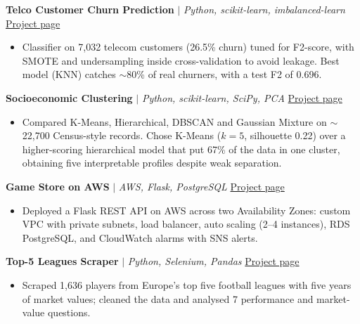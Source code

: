\documentclass[10pt,a4paper]{article}
\begin{document}
\noindent
\textbf{Telco Customer Churn Prediction} $\vert$ \textit{\small Python, scikit-learn, imbalanced-learn} \hfill \href{https://rodrigopintoaguilera.github.io/churn/}{\small Project page}
\begin{itemize}
    \item Classifier on 7,032 telecom customers (26.5\% churn) tuned for F2-score, with SMOTE and undersampling inside cross-validation to avoid leakage. Best model (KNN) catches $\sim$80\% of real churners, with a test F2 of 0.696.
\end{itemize}

\vspace{3pt}

\noindent
\textbf{Socioeconomic Clustering} $\vert$ \textit{\small Python, scikit-learn, SciPy, PCA} \hfill \href{https://rodrigopintoaguilera.github.io/clustering/}{\small Project page}
\begin{itemize}
    \item Compared K-Means, Hierarchical, DBSCAN and Gaussian Mixture on $\sim$22,700 Census-style records. Chose K-Means ($k=5$, silhouette 0.22) over a higher-scoring hierarchical model that put 67\% of the data in one cluster, obtaining five interpretable profiles despite weak separation.
\end{itemize}

\vspace{3pt}

\noindent
\textbf{Game Store on AWS} $\vert$ \textit{\small AWS, Flask, PostgreSQL} \hfill \href{https://rodrigopintoaguilera.github.io/aws-game-store/}{\small Project page}
\begin{itemize}
    \item Deployed a Flask REST API on AWS across two Availability Zones: custom VPC with private subnets, load balancer, auto scaling (2--4 instances), RDS PostgreSQL, and CloudWatch alarms with SNS alerts.
\end{itemize}

\vspace{3pt}

\noindent
\textbf{Top-5 Leagues Scraper} $\vert$ \textit{\small Python, Selenium, Pandas} \hfill \href{https://rodrigopintoaguilera.github.io/football-scraper/}{\small Project page}
\begin{itemize}
    \item Scraped 1,636 players from Europe's top five football leagues with five years of market values; cleaned the data and analysed 7 performance and market-value questions.
\end{itemize}
\end{document}
